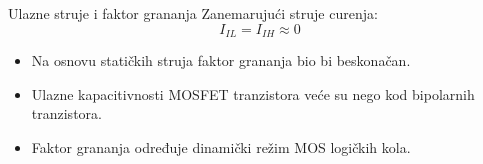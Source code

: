 \begin{frame}[label=09_1-s026]{Ulazne struje i faktor grananja}\setlength{\parskip}{2pt}\setlength{\abovedisplayskip}{4pt}\setlength{\belowdisplayskip}{4pt}\setlength{\abovedisplayshortskip}{3pt}\setlength{\belowdisplayshortskip}{3pt}
Zanemarujući struje curenja:\[I_{IL}=I_{IH}\approx0\]
\begin{itemize}
\item Na osnovu statičkih struja faktor grananja bio bi beskonačan.
\item Ulazne kapacitivnosti MOSFET tranzistora veće su nego kod bipolarnih tranzistora.
\item Faktor grananja određuje dinamički režim MOS logičkih kola.
\end{itemize}
\end{frame}

